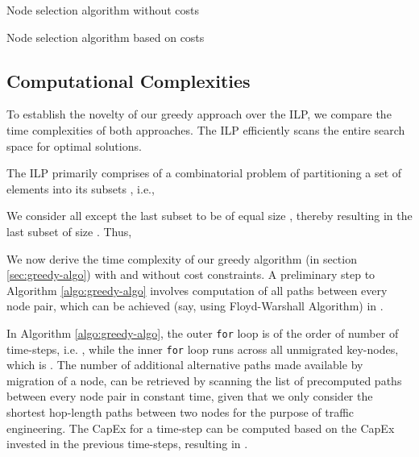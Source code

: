 \documentclass[conference]{IEEEtran}
\begin{document}
\begin{algorithm}
\caption{Node selection algorithm without costs}
\label{algo:node-selection-without-cost}
\begin{algorithmic}
\ENDFOR
\end{algorithmic}
\end{algorithm}

\begin{algorithm}
\caption{Node selection algorithm based on costs}
\label{algo:node-selection-with-cost}
\begin{algorithmic}
	\STATE {}
\ENDFOR
{}
	\IF {}
		\STATE {}
	\ELSE
	\ENDIF
\ENDFOR
\end{algorithmic}
\end{algorithm}

\subsection{Computational Complexities}

\par To establish the novelty of our greedy approach over the ILP, we compare
the time complexities of both approaches. The ILP efficiently scans the entire
search space for optimal solutions. 

\par The ILP primarily comprises of a
combinatorial problem of partitioning a set  of  elements into its
subsets , i.e., 




We consider all except the last subset to be of equal size , thereby resulting in the last subset of size .
Thus, 

\par We now derive the time complexity of our greedy algorithm (in section
\ref{sec:greedy-algo}) with and without cost constraints. A preliminary step to
Algorithm \ref{algo:greedy-algo} involves computation of all paths between every
node pair, which can be achieved (say, using Floyd-Warshall Algorithm) in
.

\par In Algorithm \ref{algo:greedy-algo}, the outer \texttt{for} loop is of the
order of number of time-steps, i.e. , while the inner \texttt{for} loop
runs across all unmigrated key-nodes, which is . The number of additional
alternative paths made available by migration of a node, can be retrieved by
scanning the list of precomputed paths between every node pair in constant time,
given that we only consider the shortest hop-length paths between two nodes
for the purpose of traffic engineering. The CapEx for a time-step can be computed
based on the CapEx invested in the previous time-steps, resulting in
.
\end{document}
